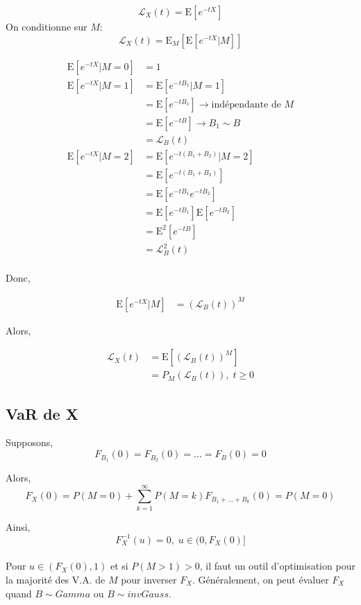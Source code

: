 \[
\mathcal{L}_X(t)=\text{E}[e^{-tX}]
\] On conditionne sur \(M\): \[
\mathcal{L}_X(t)= \text{E}_M\left [\text{E}[e^{-tX}|M]\right ]
\]

\begin{align*}
\text{E}[e^{-tX}|M=0]& =1\\
\text{E}[e^{-tX}|M=1]& =\text{E}[e^{-tB_1}|M=1]\\
& = \text{E}[e^{-tB_1}] \rightarrow \text{indépendante de }M\\
& = \text{E}[e^{-tB}] \rightarrow B_1 \sim B\\
& = \mathcal{L}_B(t)\\
\text{E}[e^{-tX}|M=2]& = \text{E}[e^{-t(B_1+B_2)}|M=2]\\
& = \text{E}[e^{-t(B_1+B_2)}]\\
& =\text{E}[e^{-tB_1} e^{-tB_2}]\\
& =\text{E}[e^{-tB_1}]\text{E}[e^{-tB_2}]\\
& =\text{E}^2[e^{-tB}]\\
& = \mathcal{L}_B^2(t)\\
\end{align*}

Donc,

\begin{align*}
\text{E}[e^{-tX}|M]& =\left (\mathcal{L}_B(t)\right )^M
\end{align*}

Alors,

\begin{align*}
\mathcal{L}_X(t)& =\text{E}\left [\left (\mathcal{L}_B(t)\right )^M \right ]\\
& = P_M\left (\mathcal{L}_B(t)\right ),\;t \geq 0
\end{align*}

\subsection{VaR de X}\label{var-de-x}

Supposons, \[F_{B_1}(0)=F_{B_2}(0)=\dots=F_B(0)=0\]

Alors, \[
F_X(0) = P(M=0)+\sum^\infty_{k=1} P(M=k)F_{B_1+\dots+B_k}(0)=P(M=0) 
\]

Ainsi, \[
F_X^{-1}(u)=0,\;u\in(0,F_X(0)]
\]\\
Pour \(u\in(F_X(0),1)\) et si \(P(M>1)>0\), il faut un outil
d'optimisation pour la majorité des V.A. de \(M\) pour inverser \(F_X\).
Généralement, on peut évaluer \(F_X\) quand \(B \sim Gamma\) ou
\(B \sim invGauss\).

